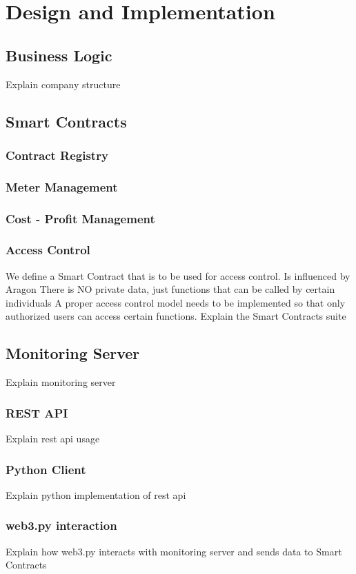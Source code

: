 \chapter{Design and Implementation}
\section{Business Logic}
Explain company structure

\section{Smart Contracts}
\subsection{Contract Registry}
\subsection{Meter Management}
\subsection{Cost - Profit Management}
\subsection{Access Control}
We define a Smart Contract that is to be used for access control. Is influenced by Aragon 
There is NO private data, just functions that can be called by certain individuals
A proper access control model needs to be implemented so that only authorized users can access certain functions. 
Explain the Smart Contracts suite

\section{Monitoring Server}
Explain monitoring server
\subsection{REST API} 
Explain rest api usage 
\subsection{Python Client}
Explain python implementation of rest api
\subsection{web3.py interaction}
Explain how web3.py interacts with monitoring server and sends data to Smart Contracts
